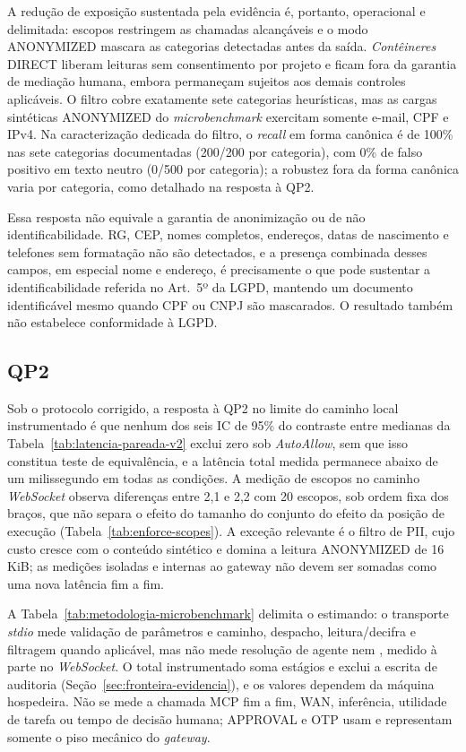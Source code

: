 A redução de exposição sustentada pela evidência é, portanto, operacional e delimitada: escopos restringem as chamadas alcançáveis e o modo ANONYMIZED mascara as categorias detectadas antes da saída. \textit{Contêineres} DIRECT liberam leituras sem consentimento por projeto e ficam fora da garantia de mediação humana, embora permaneçam sujeitos aos demais controles aplicáveis. O filtro cobre exatamente sete categorias heurísticas, mas as cargas sintéticas ANONYMIZED do \textit{microbenchmark} exercitam somente e-mail, CPF e IPv4. Na caracterização dedicada do filtro, o \textit{recall} em forma canônica é de 100\% nas sete categorias documentadas (200/200 por categoria), com 0\% de falso positivo em texto neutro (0/500 por categoria); a robustez fora da forma canônica varia por categoria, como detalhado na resposta à QP2.

Essa resposta não equivale a garantia de anonimização ou de não identificabilidade. RG, CEP, nomes completos, endereços, datas de nascimento e telefones sem formatação não são detectados, e a presença combinada desses campos, em especial nome e endereço, é precisamente o que pode sustentar a identificabilidade referida no Art.~5º da LGPD, mantendo um documento identificável mesmo quando CPF ou CNPJ são mascarados. O resultado também não estabelece conformidade à LGPD.

\subsection{QP2}
Sob o protocolo corrigido, a resposta à QP2 no limite do caminho local instrumentado é que nenhum dos seis IC de 95\% do contraste entre medianas da Tabela~\ref{tab:latencia-pareada-v2} exclui zero sob \textit{AutoAllow}, sem que isso constitua teste de equivalência, e a latência total medida permanece abaixo de um milissegundo em todas as condições. A medição de escopos no caminho \textit{WebSocket} observa diferenças entre 2,1 e 2,2\micro{} com 20 escopos, sob ordem fixa dos braços, que não separa o efeito do tamanho do conjunto do efeito da posição de execução (Tabela~\ref{tab:enforce-scopes}). A exceção relevante é o filtro de PII, cujo custo cresce com o conteúdo sintético e domina a leitura ANONYMIZED de 16 KiB; as medições isoladas e internas ao gateway não devem ser somadas como uma nova latência fim a fim.

A Tabela~\ref{tab:metodologia-microbenchmark} delimita o estimando: o transporte \textit{stdio} mede validação de parâmetros e caminho, despacho, leitura/decifra e filtragem quando aplicável, mas não mede resolução de agente nem , medido à parte no \textit{WebSocket}. O total instrumentado soma estágios e exclui a escrita de auditoria (Seção~\ref{sec:fronteira-evidencia}), e os valores dependem da máquina hospedeira. Não se mede a chamada MCP fim a fim, WAN, inferência, utilidade de tarefa ou tempo de decisão humana; APPROVAL e OTP usam  e representam somente o piso mecânico do \textit{gateway}.

